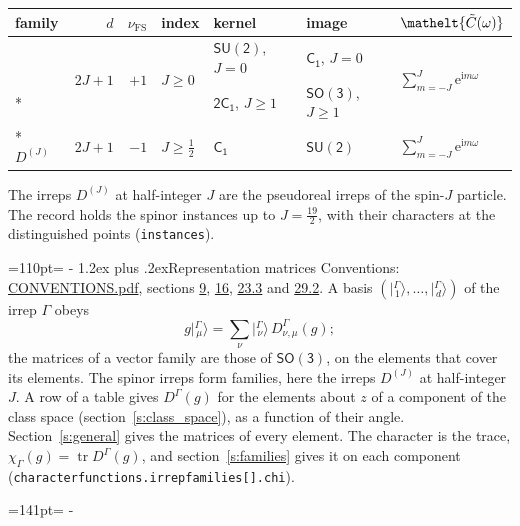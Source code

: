 \documentclass[10pt,a4paper]{article}
\makeatletter
\renewcommand\section{\@startsection{section}{1}{\z@}{-3ex plus -1ex minus -.2ex}%
  {1.2ex plus .2ex}{\normalfont\large\sffamily\bfseries\color{parttitle}}}
\def\grouprule#1#2{\noalign{\marks\LTgroupmarks{\the\belowrulesep}\nobreak\vskip#1%
  \vskip\aboverulesep}\multispan\LT@cols\unskip{\leaders\hrule\@height#2\hfill\kern\z@}\cr
  \noalign{\penalty\LTrulebreak\vskip\belowrulesep\global\@lastruleclass\z@}}
\newcommand{\needspace}[1]{\par\penalty-100\begingroup\dimen0=#1\relax\dimen2=\pagegoal
  \advance\dimen2-\pagetotal\ifdim\dimen0>\dimen2\relax\ifdim\dimen2>0pt\vfil\break\fi\fi
  \endgroup}
\numberwithin{equation}{section}
\newcommand{\eltfont}[1]{{\let\sigma\eltsigma\mathelt{#1}}}
\newcommand{\grp}[1]{\mathsf{#1}}
\newcommand{\comp}[1]{\eltfont{#1}}
\newcommand{\iunit}{\mathrm{i}}
\newcommand{\expe}{\mathrm{e}}
\newcommand{\irrJ}[1]{D^{(#1)}}
\newcommand{\repD}[1]{D^{#1}}
\newcommand{\irchar}[1]{\chi_{#1}}
\newcommand{\fsind}{\nu_{\mathrm{FS}}}
\newcommand{\trace}{\operatorname{tr}}
\newcommand{\intx}{\mu}
\newcommand{\irket}[2]{\bigl\lvert{}^{#1}_{\,#2}\bigr\rangle}
\newcommand{\lift}[1]{\tilde{#1}}
\makeatother
\begin{document}
{\small{\renewcommand{\arraystretch}{1.3}\begin{longtable}{@{}lrrllll@{}}\toprule
family & $d$ & $\fsind$ & index & kernel & image & $\comp{\lift{C}(\omega)}$\\\midrule\endhead
\bottomrule\endfoot\endlastfoot
\multirow{2}{*}{$\irrJ{J}$} & \multirow{2}{*}{$2J+1$} & \multirow{2}{*}{$+1$} & \multirow{2}{*}{$J \ge 0$} & \href{SU2.pdf}{$\grp{SU(2)}$}, $J = 0$ & \href{../../../rotation/data/pdf/C1.pdf}{$\grp{C_{1}}$}, $J = 0$ & \multirow{2}{*}{$\sum_{m=-J}^{J}\expe^{\iunit m\omega}$}\\*
 &  &  &  & \href{2C1.pdf}{$\grp{2C_{1}}$}, $J \ge 1$ & \href{../../../rotation/data/pdf/SO3.pdf}{$\grp{SO(3)}$}, $J \ge 1$ & \\*
\grouprule{0pt}{\lightrulewidth}
$\irrJ{J}$ & $2J+1$ & $-1$ & $J \ge \tfrac{1}{2}$ & \href{C1.pdf}{$\grp{C_{1}}$} & \href{SU2.pdf}{$\grp{SU(2)}$} & $\sum_{m=-J}^{J}\expe^{\iunit m\omega}$\\
\bottomrule\end{longtable}}}
The irreps $\irrJ{J}$ at half-integer $J$ are the pseudoreal irreps of the spin-$J$ particle.
The record holds the spinor instances up to $J = \tfrac{19}{2}$, with their characters at the distinguished points (\texttt{instances}).
\needspace{110pt}
\section{Representation matrices}\label{s:continuous_irreps}
Conventions: \href{../../CONVENTIONS.pdf}{CONVENTIONS.pdf}, sections \href{../../../rotation/CONVENTIONS.pdf\#conv.9}{9}, \href{../../../rotation/CONVENTIONS.pdf\#conv.16}{16}, \href{../../CONVENTIONS.pdf\#conv.23.3}{23.3} and \href{../../CONVENTIONS.pdf\#conv.29.2}{29.2}.
\leavevmode\label{n:vector.ket.partner}\label{n:index.partner}\label{n:matrix.irrep}A basis $(\irket{\Gamma}{1}, \dots, \irket{\Gamma}{d})$ of the irrep $\Gamma$ obeys
\begin{equation}\label{e:partner}g\irket{\Gamma}{\intx} = \sum_\nu \irket{\Gamma}{\nu}\, \repD{\Gamma}_{\nu,\intx}(g);\end{equation}
the matrices of a vector family are those of \href{../../../rotation/data/pdf/SO3.pdf}{$\grp{SO(3)}$}, on the elements that cover its elements. \label{n:index.J}The spinor irreps form families, here the irreps $\irrJ{J}$ at half-integer $J$. A row of a table gives $\repD{\Gamma}(g)$ for the elements about $z$ of a component of the class space (section~\ref{s:class_space}), as a function of their angle. Section~\ref{s:general} gives the matrices of every element.
The character is the trace, $\irchar{\Gamma}(g) = \trace\repD{\Gamma}(g)$, and section~\ref{s:families} gives it on each component (\texttt{characterfunctions.\allowbreak irrepfamilies[].\allowbreak chi}).
\needspace{141pt}
\end{document}
